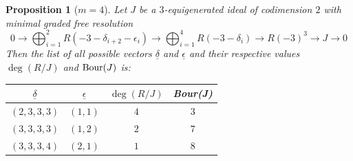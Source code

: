 \documentclass[11pt]{amsart} %
\newtheorem{Proposition}[Theorem]{Proposition}
\theoremstyle{definition}
\begin{document}
		
		\begin{Proposition}[$m=4$]
				Let $J$ be a $3$-equigenerated ideal of codimension $2$ with minimal graded free resolution
			\begin{equation}\label{res-d3-m=4}
				0\to \bigoplus_{i=1}^2R(-3-\delta_{i+2}-\epsilon_i)\to \bigoplus_{i=1}^4 R(-3-\delta_i)\to R(-3)^3\to J\to 0
			\end{equation}
		Then the list of all possible vectors $\underline{\delta}$ and $\underline{\epsilon}$ and their respective values $\deg(R/J)$ and ${\rm Bour}(J)$ is:
	
			
			\begin{center}
				\begin{tabular}{|c|c|c|c|}
					\hline
			$\underline{\delta}$&$\underline{\epsilon}$&$\deg(R/J)$&{\rm Bour}(J)\\
					\hline
					$(2,3,3,3)$&$(1,1)$&$4$&$3$\\
					$(3,3,3,3)$&$(1,2)$&$2$&$7$\\
					$(3,3,3,4)$&$(2,1)$&$1$&$8$\\
					\hline
				\end{tabular}
			\end{center}
		
		\end{Proposition}
\end{document}
